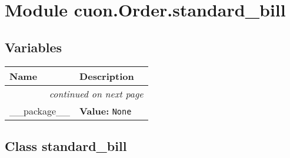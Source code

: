 %
%
%


\section{Module cuon.Order.standard\_bill}

    \label{cuon:Order:standard_bill}


  \subsection{Variables}

    \vspace{-1cm}
\hspace{\varindent}\begin{longtable}{|p{\varnamewidth}|p{\vardescrwidth}|l}
\cline{1-2}
\cline{1-2} \centering \textbf{Name} & \centering \textbf{Description}& \\
\cline{1-2}
\endhead\cline{1-2}\multicolumn{3}{r}{\small\textit{continued on next page}}\\\endfoot\cline{1-2}
\endlastfoot\raggedright \_\-\_\-p\-a\-c\-k\-a\-g\-e\-\_\-\_\- & \raggedright \textbf{Value:} 
{\tt None}&\\
\cline{1-2}
\end{longtable}



\subsection{Class standard\_bill}

